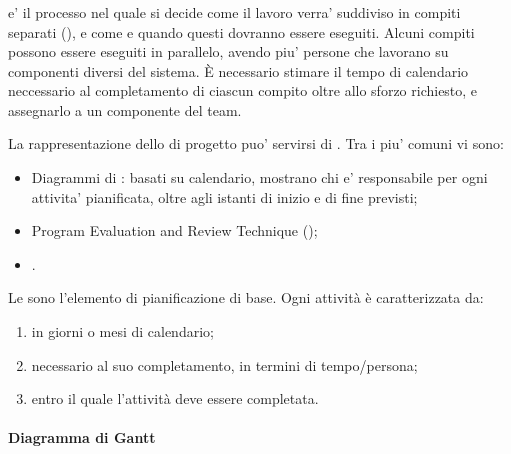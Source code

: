 \subsubsection{}


 e' il processo nel quale si decide come il lavoro
verra' suddiviso in compiti separati (), e come e quando questi
dovranno essere eseguiti. Alcuni compiti possono essere eseguiti in parallelo,
avendo piu' persone che lavorano su componenti diversi del sistema. \`E
necessario stimare il tempo di calendario neccessario al completamento di
ciascun compito oltre allo sforzo richiesto, e assegnarlo a un componente del
team.


La rappresentazione dello  di progetto puo' servirsi di
. Tra i piu' comuni vi sono:

\begin{itemize}
  \item Diagrammi di : basati su calendario, mostrano chi e'
    responsabile per ogni attivita' pianificata, oltre agli istanti di inizio e
    di fine previsti;
  \item Program Evaluation and Review Technique ();
  \item {}.
\end{itemize}

Le  sono l'elemento di pianificazione di base. Ogni
attività è caratterizzata da:

\begin{enumerate}
  \item {} in giorni o mesi di calendario;
  \item {} necessario al suo completamento, in termini di
    tempo/persona;
  \item {} entro il quale l'attività deve essere
    completata.
\end{enumerate}

\paragraph{Diagramma di Gantt}

